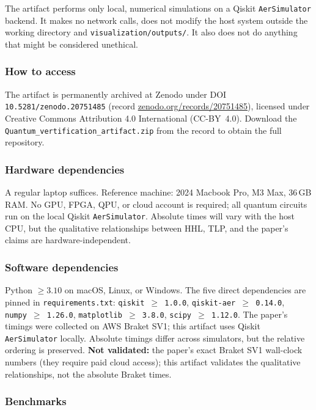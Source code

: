 \documentclass[nonacm,sigconf]{acmart}
\begin{document}
The artifact performs only local, numerical simulations
on a Qiskit \texttt{AerSimulator} backend.  It makes no network calls,
does not modify the host system outside the working directory and
\texttt{visualization/outputs/}. It also does not do anything that might be 
considered unethical.

\subsubsection{How to access}

The artifact is permanently archived at Zenodo under DOI
\texttt{10.5281/zenodo.20751485} (record
\href{https://zenodo.org/records/20751485}{zenodo.org/records/20751485}),
licensed under Creative Commons Attribution 4.0 International
(CC-BY~4.0).  Download the \texttt{Quantum\_vertification\_artifact.zip}
from the record to obtain the full repository.

\subsubsection{Hardware dependencies}

A regular laptop suffices.  Reference machine: 2024 Macbook Pro, M3 Max,
36\,GB RAM.  No GPU, FPGA, QPU, or cloud account is required; all
quantum circuits run on the local Qiskit \texttt{AerSimulator}.
Absolute times will vary with the host CPU, but the qualitative
relationships between HHL, TLP, and the paper's claims are
hardware-independent.

\subsubsection{Software dependencies}

Python $\geq 3.10$ on macOS, Linux, or Windows.  The five direct
dependencies are pinned in \texttt{requirements.txt}:
\texttt{qiskit\,$\geq$\,1.0.0}, \texttt{qiskit-aer\,$\geq$\,0.14.0},
\texttt{numpy\,$\geq$\,1.26.0},
\texttt{matplotlib\,$\geq$\,3.8.0}, \texttt{scipy\,$\geq$\,1.12.0}.
The paper's timings were collected on AWS Braket SV1; this artifact
uses Qiskit \texttt{AerSimulator} locally.  Absolute timings differ
across simulators, but the relative ordering is preserved.
\textbf{Not validated:} the paper's exact Braket SV1 wall-clock
numbers (they require paid cloud access); this artifact validates
the qualitative relationships, not the absolute Braket times.

\subsubsection{Benchmarks}
\end{document}
